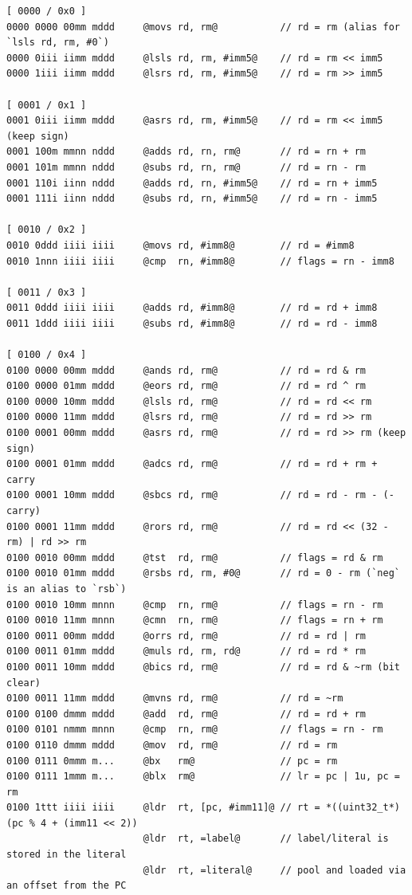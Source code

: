 \documentclass
[
    10pt,
    a4paper,
]
{article}
\begin{document}
\begin{lstlisting}[language=gnu-asm]
[ 0000 / 0x0 ]
0000 0000 00mm mddd     @movs rd, rm@           // rd = rm (alias for `lsls rd, rm, #0`)
0000 0iii iimm mddd     @lsls rd, rm, #imm5@    // rd = rm << imm5
0000 1iii iimm mddd     @lsrs rd, rm, #imm5@    // rd = rm >> imm5

[ 0001 / 0x1 ]
0001 0iii iimm mddd     @asrs rd, rm, #imm5@    // rd = rm << imm5 (keep sign)
0001 100m mmnn nddd     @adds rd, rn, rm@       // rd = rn + rm
0001 101m mmnn nddd     @subs rd, rn, rm@       // rd = rn - rm
0001 110i iinn nddd     @adds rd, rn, #imm5@    // rd = rn + imm5
0001 111i iinn nddd     @subs rd, rn, #imm5@    // rd = rn - imm5

[ 0010 / 0x2 ]
0010 0ddd iiii iiii     @movs rd, #imm8@        // rd = #imm8
0010 1nnn iiii iiii     @cmp  rn, #imm8@        // flags = rn - imm8

[ 0011 / 0x3 ]
0011 0ddd iiii iiii     @adds rd, #imm8@        // rd = rd + imm8
0011 1ddd iiii iiii     @subs rd, #imm8@        // rd = rd - imm8

[ 0100 / 0x4 ]
0100 0000 00mm mddd     @ands rd, rm@           // rd = rd & rm
0100 0000 01mm mddd     @eors rd, rm@           // rd = rd ^ rm
0100 0000 10mm mddd     @lsls rd, rm@           // rd = rd << rm
0100 0000 11mm mddd     @lsrs rd, rm@           // rd = rd >> rm
0100 0001 00mm mddd     @asrs rd, rm@           // rd = rd >> rm (keep sign)
0100 0001 01mm mddd     @adcs rd, rm@           // rd = rd + rm + carry
0100 0001 10mm mddd     @sbcs rd, rm@           // rd = rd - rm - (-carry)
0100 0001 11mm mddd     @rors rd, rm@           // rd = rd << (32 - rm) | rd >> rm
0100 0010 00mm mddd     @tst  rd, rm@           // flags = rd & rm
0100 0010 01mm mddd     @rsbs rd, rm, #0@       // rd = 0 - rm (`neg` is an alias to `rsb`)
0100 0010 10mm mnnn     @cmp  rn, rm@           // flags = rn - rm
0100 0010 11mm mnnn     @cmn  rn, rm@           // flags = rn + rm
0100 0011 00mm mddd     @orrs rd, rm@           // rd = rd | rm
0100 0011 01mm mddd     @muls rd, rm, rd@       // rd = rd * rm
0100 0011 10mm mddd     @bics rd, rm@           // rd = rd & ~rm (bit clear)
0100 0011 11mm mddd     @mvns rd, rm@           // rd = ~rm
0100 0100 dmmm mddd     @add  rd, rm@           // rd = rd + rm
0100 0101 nmmm mnnn     @cmp  rn, rm@           // flags = rn - rm
0100 0110 dmmm mddd     @mov  rd, rm@           // rd = rm
0100 0111 0mmm m...     @bx   rm@               // pc = rm
0100 0111 1mmm m...     @blx  rm@               // lr = pc | 1u, pc = rm
0100 1ttt iiii iiii     @ldr  rt, [pc, #imm11]@ // rt = *((uint32_t*)(pc % 4 + (imm11 << 2))
                        @ldr  rt, =label@       // label/literal is stored in the literal
                        @ldr  rt, =literal@     // pool and loaded via an offset from the PC


\end{lstlisting}
\end{document}
